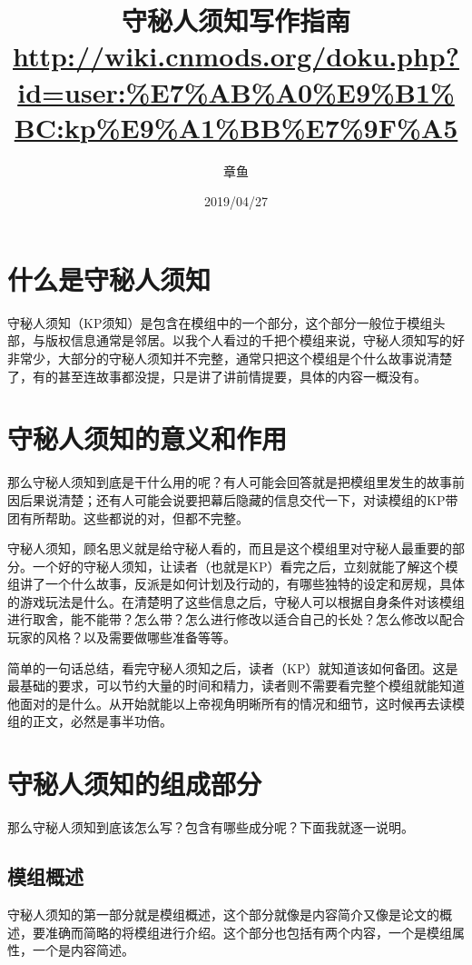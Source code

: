 \documentclass[a4paper,zihao=-4,notitlepage,twoside,openright]{ctexart}
\title{守秘人须知写作指南\\
{\footnotesize \url{http://wiki.cnmods.org/doku.php?id=user:\%E7\%AB\%A0\%E9\%B1\%BC:kp\%E9\%A1\%BB\%E7\%9F\%A5}}}
\author{章鱼}
\date{2019/04/27}
\begin{document}
\maketitle

\section{什么是守秘人须知}

守秘人须知（KP须知）是包含在模组中的一个部分，这个部分一般位于模组头部，与版权信息通常是邻居。以我个人看过的千把个模组来说，守秘人须知写的好非常少，大部分的守秘人须知并不完整，通常只把这个模组是个什么故事说清楚了，有的甚至连故事都没提，只是讲了讲前情提要，具体的内容一概没有。

\section{守秘人须知的意义和作用}

那么守秘人须知到底是干什么用的呢？有人可能会回答就是把模组里发生的故事前因后果说清楚；还有人可能会说要把幕后隐藏的信息交代一下，对读模组的KP带团有所帮助。这些都说的对，但都不完整。

守秘人须知，顾名思义就是给守秘人看的，而且是这个模组里对守秘人最重要的部分。一个好的守秘人须知，让读者（也就是KP）看完之后，立刻就能了解这个模组讲了一个什么故事，反派是如何计划及行动的，有哪些独特的设定和房规，具体的游戏玩法是什么。在清楚明了这些信息之后，守秘人可以根据自身条件对该模组进行取舍，能不能带？怎么带？怎么进行修改以适合自己的长处？怎么修改以配合玩家的风格？以及需要做哪些准备等等。

简单的一句话总结，看完守秘人须知之后，读者（KP）就知道该如何备团。这是最基础的要求，可以节约大量的时间和精力，读者则不需要看完整个模组就能知道他面对的是什么。从开始就能以上帝视角明晰所有的情况和细节，这时候再去读模组的正文，必然是事半功倍。

\section{守秘人须知的组成部分}

那么守秘人须知到底该怎么写？包含有哪些成分呢？下面我就逐一说明。

\subsection{模组概述}

守秘人须知的第一部分就是模组概述，这个部分就像是内容简介又像是论文的概述，要准确而简略的将模组进行介绍。这个部分也包括有两个内容，一个是模组属性，一个是内容简述。
\end{document}
